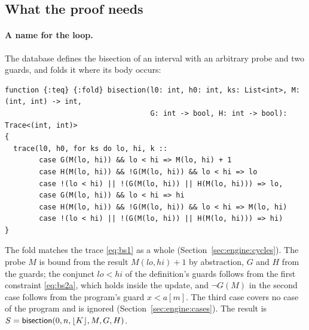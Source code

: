 \subsection{What the proof needs}
\paragraph{A name for the loop.} The database defines the bisection of an interval with an arbitrary probe and
two guards, and folds it where its body occurs:
\begin{lstlisting}
function {:teq} {:fold} bisection(l0: int, h0: int, ks: List<int>, M: (int, int) -> int,
                                  G: int -> bool, H: int -> bool): Trace<(int, int)>
{
  trace(l0, h0, for ks do lo, hi, k ::
        case G(M(lo, hi)) && lo < hi => M(lo, hi) + 1
        case H(M(lo, hi)) && !G(M(lo, hi)) && lo < hi => lo
        case !(lo < hi) || !(G(M(lo, hi)) || H(M(lo, hi))) => lo,
        case G(M(lo, hi)) && lo < hi => hi
        case H(M(lo, hi)) && !G(M(lo, hi)) && lo < hi => M(lo, hi)
        case !(lo < hi) || !(G(M(lo, hi)) || H(M(lo, hi))) => hi)
}
\end{lstlisting}
The fold matches the trace \eqref{eq:bs1} as a whole (Section~\ref{sec:engine:cycles}). The probe $M$ is bound from
the result $M(lo, hi) + 1$ by abstraction, $G$ and $H$ from the guards; the conjunct $lo < hi$ of the definition's
guards follows from the first constraint \eqref{eq:bs2a}, which holds inside the update, and $\neg G(M)$ in the
second case follows from the program's guard $x < a[m]$. The third case covers no case of the program and is
ignored (Section~\ref{sec:engine:cases}). The result is $S = \mathsf{bisection}(0, n, \lfloor K\rfloor, M, G, H)$.

